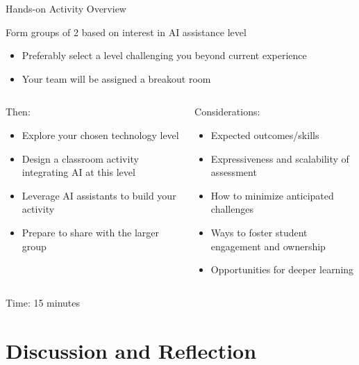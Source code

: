 \documentclass[xcolor={dvipsnames,table}, aspectratio=169]{beamer}
\begin{document}
\begin{frame}{Hands-on Activity Overview}
  

  Form groups of 2 based on interest in AI assistance level
  \begin{itemize}
    \item Preferably select a level challenging you beyond current experience
    \item Your team will be assigned a breakout room
  \end{itemize}
  
  \begin{columns}
    \begin{column}{0.5\textwidth}
      Then:
      \begin{itemize}
        \item Explore your chosen technology level
        \item Design a classroom activity integrating AI at this level
        \item Leverage AI assistants to build your activity
        \item Prepare to share with the larger group
      \end{itemize}
    \end{column}
    
    \begin{column}{0.5\textwidth}
      Considerations:
      \begin{itemize}
        \item Expected outcomes/skills
        \item Expressiveness and scalability of assessment
        \item How to minimize anticipated challenges
        \item Ways to foster student engagement and ownership
        \item Opportunities for deeper learning
      \end{itemize}
    \end{column}
  \end{columns}

  \begin{alertbox}
      Time: 15 minutes
  \end{alertbox}  
\end{frame}

\part[Discussion and Reflection]{Discussion and Reflection}
\end{document}
